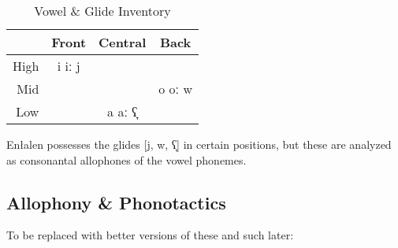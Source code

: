 \documentclass[a4paper,11pt,oneside,openany]{memoir}
\newcommand{\bripa}[1]{[#1]}
\newcommand{\pharox}{ʕ}
\newcommand{\dwnwrd}{̞}
\newcommand{\parentlang}{Enłalen}
\begin{document}
\begin{table}[h]
    \centering
    \begin{tabular}{@{}rccc@{}}
    \toprule
    \multicolumn{1}{l}{} & Front & Central & Back \\ \midrule
    High & i iː j &  &  \\
    Mid &  &  & o oː w \\
    Low &  & a aː \pharox\dwnwrd &  \\ \bottomrule
    \end{tabular}
    \caption{Vowel \& Glide Inventory}
    \label{tab:enl-vowels}
\end{table}

\parentlang{} possesses the glides \bripa{j, w, \pharox\dwnwrd} in certain positions, but these are analyzed as consonantal allophones of the vowel phonemes.

\subsection{Allophony \& Phonotactics}

To be replaced with better versions of these and such later:
\end{document}
